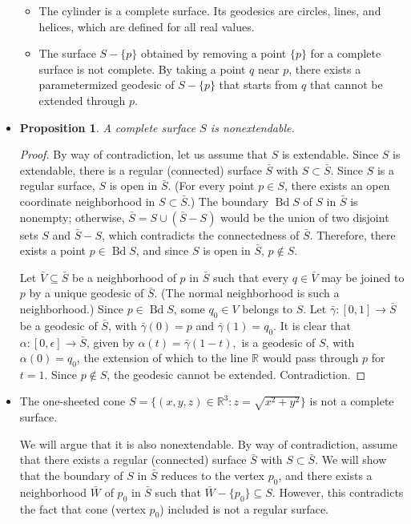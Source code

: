 \documentclass[10pt]{article}
\newtheorem{proposition}[lemma]{Proposition}
\newcommand{\ra}{\rightarrow}
\newcommand{\Real}{\mathbb{R}}
\newcommand{\sseq}{\subseteq}
\DeclareMathOperator{\Bd}{Bd}
\begin{document}
\begin{itemize}
\begin{itemize}
      \item The cylinder is a complete surface. Its geodesics are circles, lines, and helices, which are defined for all real values.  

      \item The surface $S - \{ p \}$ obtained by removing a point $\{ p \}$ for a complete surface is not complete. By taking a point $q$ near $p$, there exists a parametermized geodesic of $S - \{ p \}$ that starts from $q$ that cannot be extended through $p$.
    \end{itemize}

    \item \begin{proposition}
      A complete surface $S$ is nonextendable.
    \end{proposition}

    \begin{proof}
      By way of contradiction, let us assume that $S$ is extendable. Since $S$ is extendable, there is a regular (connected) surface $\bar S$ with $S \subset \bar S$. Since $S$ is a regular surface, $S$ is open in $\bar S$. (For every point $p \in S$, there exists an open coordinate neighborhood in $S \subset \bar S$.) The boundary $\Bd S$ of $S$ in $\bar S$ is nonempty; otherwise, $\bar S = S \cup (\bar S - S)$ would be the union of two disjoint sets $S$ and $\bar S - S$, which contradicts the connectedness of $\bar S$. Therefore, there exists a point $p \in \Bd S$, and since $S$ is open in $\bar S$, $p \not\in S$.

      Let $\bar V \sseq \bar S$ be a neighborhood of $p$ in $\bar S$ such that every $q \in \bar V$ may be joined to $p$ by a unique geodesic of $\bar S$. (The normal neighborhood is such a neighborhood.) Since $p \in \Bd S$, some $q_0 \in V$ belongs to $S$. Let $\bar \gamma : [0,1] \ra \bar S$ be a geodesic of $\bar S$, with $\bar\gamma(0) = p$ and $\bar\gamma(1) = q_0$. It is clear that $\alpha:[0, \epsilon] \ra \bar S$, given by $\alpha(t) = \bar\gamma(1-t),$ is a geodesic of $S$, with $\alpha(0) = q_0$, the extension of which to the line $\Real$ would pass through $p$ for $t = 1$. Since $p \not\in S$, the geodesic cannot be extended. Contradiction.
    \end{proof}

    \item The one-sheeted cone $S = \{ (x,y,z) \in \Real^3 : z = \sqrt{x^2 + y^2} \}$ is not a complete surface.

    We will argue that it is also nonextendable. By way of contradiction, assume that there exists a regular (connected) surface $\bar S$ with $S \subset \bar S$. We will show that the boundary of $S$ in $\bar S$ reduces to the vertex $p_0$, and there exists a neighborhood $\bar W$ of $p_0$ in $\bar S$ such that $\bar W - \{ p_0 \} \sseq S$. However, this contradicts the fact that cone (vertex $p_0$) included is not a regular surface.


\end{itemize}
\end{document}
